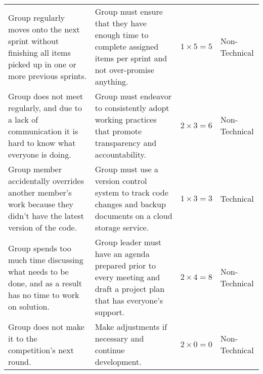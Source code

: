 \begin{table}
\begin{tabular*}{14.0cm}{p{4.0cm}p{5.0cm}p{1.5cm}p{2cm}}
    \addlinespace[0.5em]
    Group regularly moves onto the next sprint without finishing all items picked up in one or more previous sprints. & Group must ensure that they have enough time to complete assigned items per sprint and not over-promise anything. & $1 \times 5 = 5$ & Non-Technical \\
    \addlinespace[0.5em]
    Group does not meet regularly, and due to a lack of communication it is hard to know what everyone is doing. & Group must endeavor to consistently adopt working practices that promote transparency and accountability. & $2 \times 3 = 6$ & Non-Technical \\
    \addlinespace[0.5em]
    Group member accidentally overrides another member’s work because they didn’t have the latest version of the code. & Group must use a version control system to track code changes and backup documents on a cloud storage service. & $1 \times 3 = 3$ & Technical \\
    \addlinespace[0.5em]
    Group spends too much time discussing what needs to be done, and as a result has no time to work on solution. & Group leader must have an agenda prepared prior to every meeting and draft a project plan that has everyone’s support. & $2 \times 4 = 8$ & Non-Technical \\
    \addlinespace[0.5em]
    Group does not make it to the competition’s next round. & Make adjustments if necessary and continue development. & $2 \times 0 = 0$ & Non-Technical \\
    \bottomrule
  \end{tabular*}
\end{table}
